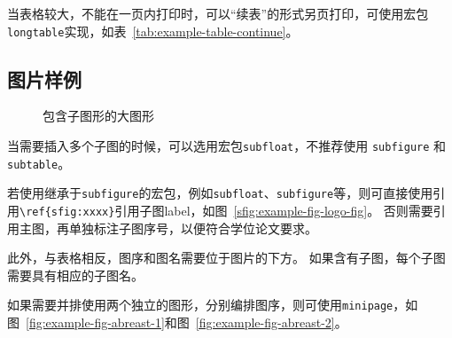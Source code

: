 当表格较大，不能在一页内打印时，可以“续表”的形式另页打印，可使用宏包\verb|longtable|实现，如表~\ref{tab:example-table-continue}。

\subsection{图片样例}
\label{sec:figure-example}

\begin{figure}[htb]
  \centering
  \hspace{4em}
  \caption{包含子图形的大图形}
  \label{fig:example-fig-subfloat}
\end{figure}

当需要插入多个子图的时候，可以选用宏包\verb|subfloat|，不推荐使用
\verb|subfigure| 和 \verb|subtable|。

若使用继承于\verb|subfigure|的宏包，例如\verb|subfloat|、\verb|subfigure|等，则可直接使用引用\verb|\ref{sfig:xxxx}|引用子图label，如图~\ref{sfig:example-fig-logo-fig}。
否则需要引用主图，再单独标注子图序号，以便符合学位论文要求。

此外，与表格相反，图序和图名需要位于图片的下方。
如果含有子图，每个子图需要具有相应的子图名。


如果需要并排使用两个独立的图形，分别编排图序，则可使用\verb|minipage|，如图~\ref{fig:example-fig-abreast-1}和图~\ref{fig:example-fig-abreast-2}。

